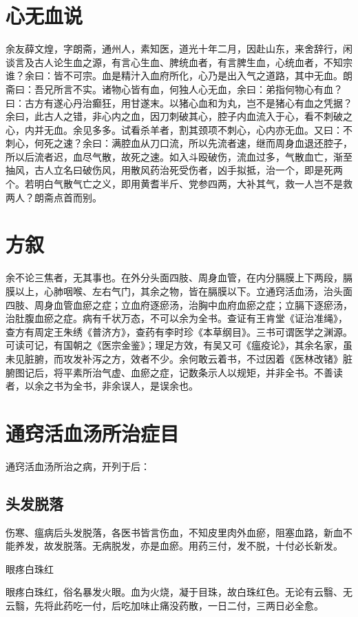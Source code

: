 \documentclass[a4paper,12pt,UTF8,twoside]{ctexbook}
\begin{document}
	\chapter{心无血说}
	余友薛文煌，字朗斋，通州人，素知医，道光十年二月，因赴山东，来舍辞行，闲谈言及古人论生血之源，有言心生血、脾统血者，有言脾生血，心统血者，不知宗谁？余曰：皆不可宗。血是精汁入血府所化，心乃是出入气之道路，其中无血。朗斋曰：吾兄所言不实。诸物心皆有血，何独人心无血，余曰：弟指何物心有血？曰：古方有遂心丹治癫狂，用甘遂末。以猪心血和为丸，岂不是猪心有血之凭据？余曰，此古人之错，非心内之血，因刀刺破其心，腔子内血流入于心，看不刺破之心，内并无血。余见多多。试看杀羊者，割其颈项不刺心，心内亦无血。又曰：不刺心，何死之速？余曰：满腔血从刀口流，所以先流者速，继而周身血退还腔子，所以后流者迟，血尽气散，故死之速。如入斗殴破伤，流血过多，气散血亡，渐至抽风，古人立名曰破伤风，用散风药治死受伤者，凶手拟抵，治一个，即是死两个。若明白气散气亡之义，即用黄耆半斤、党参四两，大补其气，救一人岂不是救两人？朗斋点首而别。
	
	\chapter{方叙}
	余不论三焦者，无其事也。在外分头面四肢、周身血管，在内分膈膜上下两段，膈膜以上，心肺咽喉、左右气门，其余之物，皆在膈膜以下。立通窍活血汤，治头面四肢、周身血管血瘀之症；立血府逐瘀汤，治胸中血府血瘀之症；立膈下逐瘀汤，治肚腹血瘀之症。病有千状万态，不可以余为全书。查证有王肯堂《证治准绳》，查方有周定王朱绣《普济方》，查药有李时珍《本草纲目》。三书可谓医学之渊源。可读可记，有国朝之《医宗金鉴》；理足方效，有吴又可《瘟疫论》，其余名家，虽未见脏腑，而攻发补泻之方，效者不少。余何敢云着书，不过因着《医林改锗》脏腑图记后，将平素所治气虚、血瘀之症，记数条示人以规矩，并非全书。不善读者，以余之书为全书，非余误人，是误余也。
	\chapter{通窍活血汤所治症目}
	通窍活血汤所治之病，开列于后：
	\section{头发脱落}
	
	
	伤寒、瘟病后头发脱落，各医书皆言伤血，不知皮里肉外血瘀，阻塞血路，新血不能养发，故发脱落。无病脱发，亦是血瘀。用药三付，发不脱，十付必长新发。
	
	眼疼白珠红
	
	眼疼白珠红，俗名暴发火眼。血为火烧，凝于目珠，故白珠红色。无论有云翳、无云翳，先将此药吃一付，后吃加味止痛没药散，一日二付，三两日必全愈。
	
\end{document}
